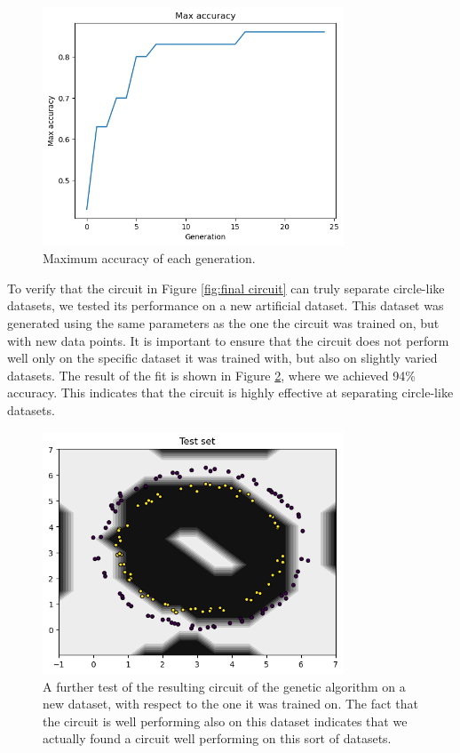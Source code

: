 \documentclass[12pt]{article}
\begin{document}
\begin{figure}[h!]
    \centering
    \includegraphics[width=0.8\textwidth]{images/maxaccuracy.png}
    \caption{Maximum accuracy of each generation.}
    \label{fig:max accuracy}
\end{figure}

To verify that the circuit in Figure \ref{fig:final circuit} can truly separate circle-like datasets, we tested its performance on a new artificial dataset. This dataset was generated using the same parameters as the one the circuit was trained on, but with new data points. It is important to ensure that the circuit does not perform well only on the specific dataset it was trained with, but also on slightly varied datasets. The result of the fit is shown in Figure \ref{fig:awesome}, where we achieved 94\% accuracy. This indicates that the circuit is highly effective at separating circle-like datasets.
\begin{figure}[h!]
    \centering
    \includegraphics[width=0.8\textwidth]{images/awesomeresult.png}
    \caption{A further test of the resulting circuit of the genetic algorithm on a new dataset, with respect to the one it was trained on. The fact that the circuit is well performing also on this dataset indicates that we actually found a circuit well performing on this sort of datasets.}
    \label{fig:awesome}
\end{figure}
\end{document}
